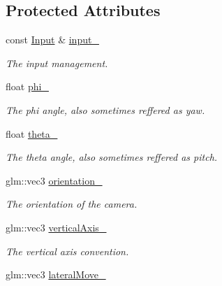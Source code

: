 \subsection*{Protected Attributes}
\begin{DoxyCompactItemize}
\item 
\hypertarget{classCamera_abb6eecba65dc1877d649f77f28dcd6ca}{}const \hyperlink{classInput}{Input} \& \hyperlink{classCamera_abb6eecba65dc1877d649f77f28dcd6ca}{input\+\_\+}\label{classCamera_abb6eecba65dc1877d649f77f28dcd6ca}

\begin{DoxyCompactList}\small\item\em The input management. \end{DoxyCompactList}\item 
\hypertarget{classCamera_a8c50ee4d80451716b8253b30c857569f}{}float \hyperlink{classCamera_a8c50ee4d80451716b8253b30c857569f}{phi\+\_\+}\label{classCamera_a8c50ee4d80451716b8253b30c857569f}

\begin{DoxyCompactList}\small\item\em The phi angle, also sometimes reffered as yaw. \end{DoxyCompactList}\item 
\hypertarget{classCamera_a2338b5b1bcb16ecd098156c434ba4cca}{}float \hyperlink{classCamera_a2338b5b1bcb16ecd098156c434ba4cca}{theta\+\_\+}\label{classCamera_a2338b5b1bcb16ecd098156c434ba4cca}

\begin{DoxyCompactList}\small\item\em The theta angle, also sometimes reffered as pitch. \end{DoxyCompactList}\item 
\hypertarget{classCamera_a1b10fb1e06e27545a419cc17b5c96388}{}glm\+::vec3 \hyperlink{classCamera_a1b10fb1e06e27545a419cc17b5c96388}{orientation\+\_\+}\label{classCamera_a1b10fb1e06e27545a419cc17b5c96388}

\begin{DoxyCompactList}\small\item\em The orientation of the camera. \end{DoxyCompactList}\item 
\hypertarget{classCamera_af83f5328265cf1633d6d6788e7ed5090}{}glm\+::vec3 \hyperlink{classCamera_af83f5328265cf1633d6d6788e7ed5090}{vertical\+Axis\+\_\+}\label{classCamera_af83f5328265cf1633d6d6788e7ed5090}

\begin{DoxyCompactList}\small\item\em The vertical axis convention. \end{DoxyCompactList}\item 
\hypertarget{classCamera_a634f2ef128ac82ce60a20cb126b50988}{}glm\+::vec3 \hyperlink{classCamera_a634f2ef128ac82ce60a20cb126b50988}{lateral\+Move\+\_\+}\label{classCamera_a634f2ef128ac82ce60a20cb126b50988}


\end{DoxyCompactItemize}
